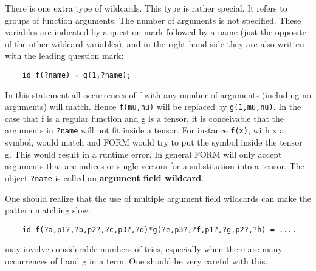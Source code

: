 There is one extra type of wildcards. This type is rather special. It 
refers to groups of function
arguments. 
The number of arguments is not specified. These variables are indicated by 
a question mark followed by a name (just the opposite of the other wildcard 
variables), and in the right hand side they are also written with the 
leading question mark:
\begin{verbatim}
    id f(?name) = g(1,?name);
\end{verbatim}
In this statement all occurrences of f with any number of 
arguments (including no arguments) will match. Hence \verb:f(mu,nu): will 
be replaced by \verb:g(1,mu,nu):. In the case that f is a regular function 
and g is a tensor, it is conceivable that the arguments in \verb:?name: 
will not fit inside a tensor. For instance \verb:f(x):, with x a symbol, 
would match and FORM would try to put the symbol inside the tensor g. This 
would result in a runtime error. In general FORM will only accept arguments 
that are indices or single vectors for a substitution into a tensor. The 
object \verb:?name: is called an {\bf argument field wildcard}.

One should realize that the use of multiple argument field wildcards can 
make the pattern matching slow.
\begin{verbatim}
    id f(?a,p1?,?b,p2?,?c,p3?,?d)*g(?e,p3?,?f,p1?,?g,p2?,?h) = ....
\end{verbatim}
may involve considerable numbers of tries, especially when there are many 
occurrences of f and g in a term. One should be very careful with this.
 
